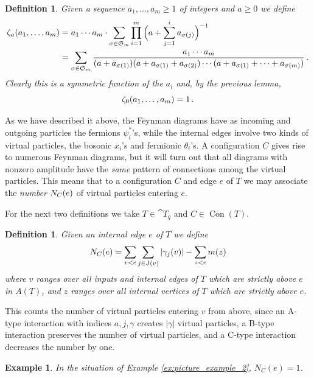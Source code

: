 \documentclass[english,letter paper,12pt,leqno]{article}
\theoremstyle{example}
\newtheorem{definition}[theorem]{Definition}
\newtheorem{example}[theorem]{Example}
\numberwithin{equation}{section}
\def\be{\begin{equation}}
\def\ee{\end{equation}}
\begin{document}
\begin{definition} Given a sequence $a_1,\ldots,a_m \ge 1$ of integers and $a \ge 0$ we define
\begin{align*}
\zeta_a(a_1, \ldots, a_m) &= a_1 \cdots a_m \cdot \sum_{\sigma \in \mathfrak{S}_m} \prod_{i=1}^{m} \Big( a + \sum_{j=1}^i a_{\sigma(j)} \Big)^{-1} \\
&= \sum_{\sigma \in \mathfrak{S}_m} \frac{a_1 \cdots a_m}{(a + a_{\sigma(1)}) (a + a_{\sigma(1)} + a_{\sigma(2)}) \cdots (a + a_{\sigma(1)} + \cdots + a_{\sigma(m)})}\,.
\end{align*}
Clearly this is a symmetric function of the $a_i$ and, by the previous lemma,
\be
\samp_0(a_1,\ldots,a_m) = 1\,.
\ee
\end{definition}

As we have described it above, the Feynman diagrams have as incoming and outgoing particles the fermions $\psi_i^*$'s, while the internal edges involve two kinds of virtual particles, the bosonic $x_i$'s and fermionic $\theta_i$'s. A configuration $C$ gives rise to numerous Feynman diagrams, but it will turn out that all diagrams with nonzero amplitude have the \emph{same} pattern of connections among the virtual particles. This means that to a configuration $C$ and edge $e$ of $T$ we may associate the \emph{number} $N_C(e)$ of virtual particles entering $e$.

For the next two definitions we take $T \in \cat{T}_q$ and $C \in \operatorname{Con}(T)$.

\begin{definition} Given an internal edge $e$ of $T$ we define
\[
N_C(e) = \sum_{v < e} \sum_{j \in J(v)} | \gamma_j(v) | - \sum_{z < e} m(z)
\]
where $v$ ranges over all inputs and internal edges of $T$ which are strictly above $e$ in $A(T)$, and $z$ ranges over all internal vertices of $T$ which are strictly above $e$.
\end{definition}

This counts the number of virtual particles entering $v$ from above, since an A-type interaction with indices $a,j,\gamma$ creates $|\gamma|$ virtual particles, a B-type interaction preserves the number of virtual particles, and a C-type interaction decreases the number by one.

\begin{example} In the situation of Example \ref{ex:picture_example_2}, $N_C(e) = 1$.
\end{example}
\end{document}
